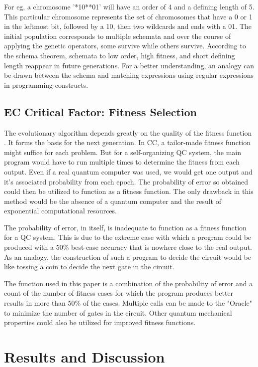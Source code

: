 \documentclass[conference]{IEEEtran}
\begin{document}
For eg, a chromosome '*10**01' will have an order of 4 and a defining length of 5. This particular chromosome represents the set of chromosomes that have a 0 or 1 in the leftmost bit, followed by a 10, then two wildcards and ends with a 01. The initial population corresponds to multiple schemata and over the course of applying the genetic operators, some survive while others survive. According to the schema theorem, schemata to low order, high fitness, and short defining length reappear in future generations. For a better understanding, an analogy can be drawn between the schema and matching expressions using regular expressions in programming constructs.


\subsection{EC Critical Factor: Fitness Selection}
The evolutionary algorithm depends greatly on the quality of the fitness function \cite{haram}. It forms the basis for the next generation. In CC, a tailor-made fitness function might suffice for each problem. But for a self-organizing QC system, the main program would have to run multiple times to determine the fitness from each output. Even if a real quantum computer was used, we would get one output and it's associated probability from each epoch. The probability of error so obtained could then be utilized to function as a fitness function. The only drawback in this method would be the absence of a quantum computer and the result of exponential computational resources. 

The probability of error, in itself, is inadequate to function as a fitness function for a QC system. This is due to the extreme ease with which a program could be produced with a 50\% best-case accuracy that is nowhere close to the real output. As an analogy, the construction of such a program to decide the circuit would be like tossing a coin to decide the next gate in the circuit. 

The function used in this paper is a combination of the probability of error and a count of the number of fitness cases for which the program produces better results in more than 50\% of the cases. Multiple calls can be made to the "Oracle" to minimize the number of gates in the circuit. Other quantum mechanical properties could also be utilized for improved fitness functions. 


\section{Results and Discussion}
\end{document}
